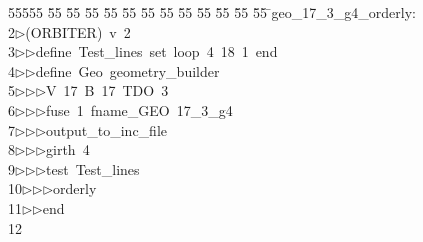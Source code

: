 %
%
\begin{tabbing}
55555 \= 55 \= 55 \= 55 \= 55 \= 55 \= 55 \= 55 \= 55 \= 55 \= 55 \= 55 \= 55 \= \>geo\_17\_3\_g4\_orderly:\\[0pt]
2\>$\triangleright$\>(ORBITER)\ v\ 2\ \\[0pt]
3\>$\triangleright$\>$\triangleright$\>define\ Test\_lines\ set\ loop\ 4\ 18\ 1\ end\ \\[0pt]
4\>$\triangleright$\>$\triangleright$\>define\ Geo\ geometry\_builder\ \\[0pt]
5\>$\triangleright$\>$\triangleright$\>$\triangleright$\>V\ 17\ B\ 17\ TDO\ 3\ \\[0pt]
6\>$\triangleright$\>$\triangleright$\>$\triangleright$\>fuse\ 1\ fname\_GEO\ 17\_3\_g4\ \\[0pt]
7\>$\triangleright$\>$\triangleright$\>$\triangleright$\>output\_to\_inc\_file\ \\[0pt]
8\>$\triangleright$\>$\triangleright$\>$\triangleright$\>girth\ 4\ \\[0pt]
9\>$\triangleright$\>$\triangleright$\>$\triangleright$\>test\ Test\_lines\ \\[0pt]
10\>$\triangleright$\>$\triangleright$\>$\triangleright$\>orderly\ \\[0pt]
11\>$\triangleright$\>$\triangleright$\>end\\[0pt]
12\>\end{tabbing}
